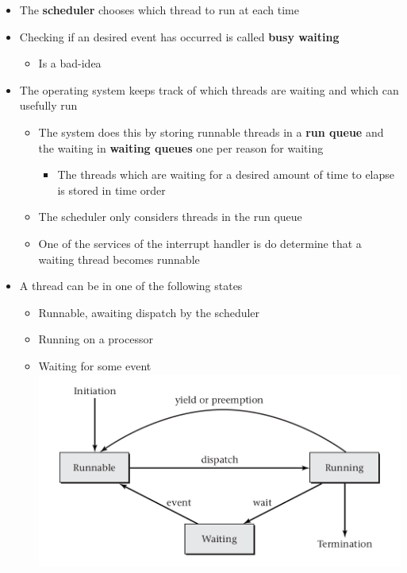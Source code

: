 \documentclass[11pt]{article}
\makeatletter
\def\maxwidth{\ifdim\Gin@nat@width>\linewidth\linewidth
    \else\Gin@nat@width\fi}
\let\Oldincludegraphics\includegraphics
\renewcommand{\includegraphics}[1]{\Oldincludegraphics[width=.8\maxwidth]{#1}}
\providecommand{\tightlist}{%
      \setlength{\itemsep}{0pt}\setlength{\parskip}{0pt}}
\makeatother
\begin{document}
\begin{itemize}
\tightlist
\item
  The \textbf{scheduler} chooses which thread to run at each time
\item
  Checking if an desired event has occurred is called \textbf{busy
  waiting}

  \begin{itemize}
  \tightlist
  \item
    Is a bad-idea
  \end{itemize}
\item
  The operating system keeps track of which threads are waiting and
  which can usefully run

  \begin{itemize}
  \tightlist
  \item
    The system does this by storing runnable threads in a \textbf{run
    queue} and the waiting in \textbf{waiting queues} one per reason for
    waiting

    \begin{itemize}
    \tightlist
    \item
      The threads which are waiting for a desired amount of time to
      elapse is stored in time order
    \end{itemize}
  \item
    The scheduler only considers threads in the run queue
  \item
    One of the services of the interrupt handler is do determine that a
    waiting thread becomes runnable
  \end{itemize}
\item
  A thread can be in one of the following states

  \begin{itemize}
  \tightlist
  \item
    Runnable, awaiting dispatch by the scheduler
  \item
    Running on a processor
  \item
    Waiting for some event\\
    \includegraphics{img/scheduling_states.png}
  \end{itemize}
\end{itemize}
\end{document}
